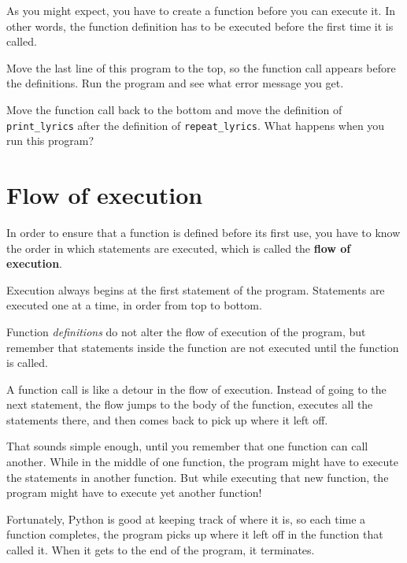 \documentclass[10pt]{book}
\begin{document}

As you might expect, you have to create a function before you can
execute it.  In other words, the function definition has to be
executed before the first time it is called.

\begin{ex}
Move the last line of this program
to the top, so the function call appears before the definitions. Run 
the program and see what error
message you get.
\end{ex}

\begin{ex}
Move the function call back to the bottom
and move the definition of \verb"print_lyrics" after the definition of
\verb"repeat_lyrics".  What happens when you run this program?
\end{ex}


\section{Flow of execution}

In order to ensure that a function is defined before its first use,
you have to know the order in which statements are executed, which is
called the {\bf flow of execution}.

Execution always begins at the first statement of the program.
Statements are executed one at a time, in order from top to bottom.

Function {\em definitions} do not alter the flow of execution of the
program, but remember that statements inside the function are not
executed until the function is called.

A function call is like a detour in the flow of execution. Instead of
going to the next statement, the flow jumps to the body of
the function, executes all the statements there, and then comes back
to pick up where it left off.

That sounds simple enough, until you remember that one function can
call another.  While in the middle of one function, the program might
have to execute the statements in another function. But while
executing that new function, the program might have to execute yet
another function!

Fortunately, Python is good at keeping track of where it is, so each
time a function completes, the program picks up where it left off in
the function that called it.  When it gets to the end of the program,
it terminates.
\end{document}
